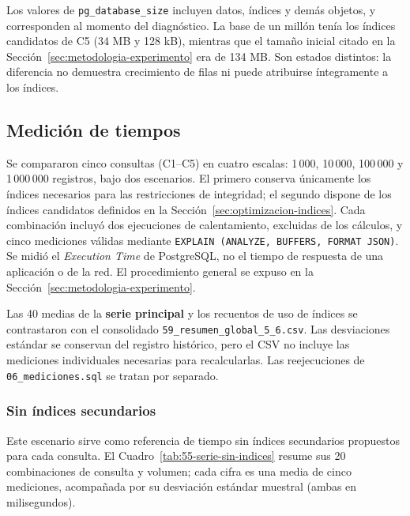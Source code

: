 \documentclass[12pt,a4paper]{article}
\begin{document}
Los valores de \texttt{pg\_database\_size} incluyen datos, índices y
demás objetos, y corresponden al momento del diagnóstico. La base
de un millón tenía los índices candidatos de C5 (34 MB y 128 kB),
mientras que el tamaño inicial citado en la
Sección~\ref{sec:metodologia-experimento} era de 134 MB. Son
estados distintos: la diferencia no demuestra crecimiento de filas
ni puede atribuirse íntegramente a los índices.
\subsection{Medición de tiempos}
\label{sec:medicion-tiempos}

Se compararon cinco consultas (C1--C5) en cuatro escalas: 1\,000,
10\,000, 100\,000 y 1\,000\,000 registros, bajo dos escenarios. El primero
conserva únicamente los índices necesarios para las restricciones de
integridad; el segundo dispone de los índices candidatos definidos en
la Sección~\ref{sec:optimizacion-indices}. Cada combinación incluyó
dos ejecuciones de calentamiento, excluidas de los cálculos, y cinco
mediciones válidas mediante \texttt{EXPLAIN (ANALYZE, BUFFERS, FORMAT JSON)}.
Se midió el \emph{Execution Time} de PostgreSQL, no el tiempo de respuesta
de una aplicación o de la red. El procedimiento general se expuso en la
Sección~\ref{sec:metodologia-experimento}.

Las 40 medias de la \textbf{serie principal} y los recuentos de uso
de índices se contrastaron con el consolidado
\nolinkurl{59_resumen_global_5_6.csv}. Las desviaciones estándar
se conservan del registro histórico, pero el CSV no incluye las
mediciones individuales necesarias para recalcularlas. Las
reejecuciones de \texttt{06\_mediciones.sql} se tratan por separado.

\subsubsection{Sin índices secundarios}
\label{sec:55-sin-indices}

Este escenario sirve como referencia de tiempo sin índices secundarios
propuestos para cada consulta. El Cuadro~\ref{tab:55-serie-sin-indices}
resume sus 20 combinaciones de consulta y volumen; cada cifra es una
media de cinco mediciones, acompañada por su desviación estándar
muestral (ambas en milisegundos).
\end{document}
